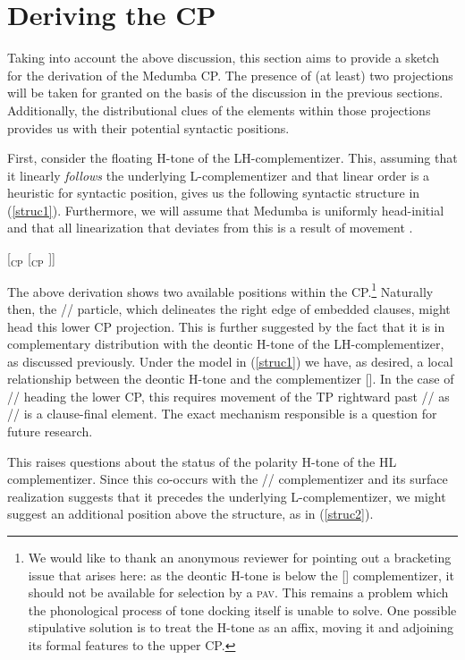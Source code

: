 \documentclass[output=paper,colorlinks,citecolor=brown]{langscibook}
\begin{document}
\section{Deriving the CP}

Taking into account the above discussion, this section aims to provide a sketch for the derivation of the Medumba CP. The presence of (at least) two projections will be taken for granted on the basis of the discussion in the previous sections. Additionally, the distributional clues of the elements within those projections provides us with their potential syntactic positions.

First, consider the floating H-tone of the LH-complementizer. This, assuming that it linearly \textit{follows} the underlying L-complementizer and that linear order is a heuristic for syntactic position, gives us the following syntactic structure in (\ref{struc1}). Furthermore, we will assume that Medumba is uniformly head-initial and that all linearization that deviates from this is a result of movement \citep{Kayne1994}.

\ea \label{struc1}
    {[$_{\text{CP}}$ \text{ {\mbuL} } [$_{\text{CP}}$ ]]}
\z

The above derivation shows two available positions within the CP.\footnote{We would like to thank an anonymous reviewer for pointing out a bracketing issue that arises here: as the deontic H-tone is below the [\mbuL] complementizer, it should not be available for selection by a \textsc{pav}. This remains a problem which the phonological process of tone docking itself is unable to solve. One possible stipulative solution is to treat the H-tone as an affix, moving it and adjoining its formal features to the upper CP.} Naturally then, the /\la/ particle, which delineates the right edge of embedded clauses, might head this lower CP projection. This is further suggested by the fact that it is in complementary distribution with the deontic H-tone of the LH-complementizer, as discussed previously. Under the model in (\ref{struc1}) we have, as desired, a local relationship between the deontic H-tone and the complementizer [\mbuL]. In the case of /\la/ heading the lower CP, this requires movement of the TP rightward past /\la/ as /\la/ is a clause-final element. The exact mechanism responsible is a question for future research.

This raises questions about the status of the polarity H-tone of the HL complementizer. Since this co-occurs with the /\la/ complementizer and its surface realization suggests that it precedes the underlying L-complementizer, we might suggest an additional position above the structure, as in (\ref{struc2}).
\end{document}
